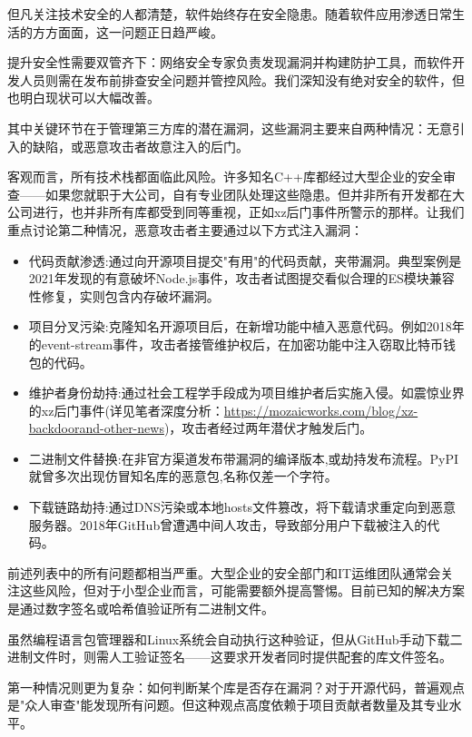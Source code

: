 
但凡关注技术安全的人都清楚，软件始终存在安全隐患。随着软件应用渗透日常生活的方方面面，这一问题正日趋严峻。

提升安全性需要双管齐下：网络安全专家负责发现漏洞并构建防护工具，而软件开发人员则需在发布前排查安全问题并管控风险。我们深知没有绝对安全的软件，但也明白现状可以大幅改善。

其中关键环节在于管理第三方库的潜在漏洞，这些漏洞主要来自两种情况：无意引入的缺陷，或恶意攻击者故意注入的后门。

客观而言，所有技术栈都面临此风险。许多知名C++库都经过大型企业的安全审查——如果您就职于大公司，自有专业团队处理这些隐患。但并非所有开发都在大公司进行，也并非所有库都受到同等重视，正如xz后门事件所警示的那样。让我们重点讨论第二种情况，恶意攻击者主要通过以下方式注入漏洞：

\begin{itemize}
\item 
代码贡献渗透:通过向开源项目提交"有用"的代码贡献，夹带漏洞。典型案例是2021年发现的有意破坏Node.js事件，攻击者试图提交看似合理的ES模块兼容性修复，实则包含内存破坏漏洞。

\item 
项目分叉污染:克隆知名开源项目后，在新增功能中植入恶意代码。例如2018年的event-stream事件，攻击者接管维护权后，在加密功能中注入窃取比特币钱包的代码。

\item 
维护者身份劫持:通过社会工程学手段成为项目维护者后实施入侵。如震惊业界的xz后门事件(详见笔者深度分析：\url{https://mozaicworks.com/blog/xz-backdoorand-other-news})，攻击者经过两年潜伏才触发后门。

\item 
二进制文件替换:在非官方渠道发布带漏洞的编译版本,或劫持发布流程。PyPI就曾多次出现仿冒知名库的恶意包,名称仅差一个字符。

\item 
下载链路劫持:通过DNS污染或本地hosts文件篡改，将下载请求重定向到恶意服务器。2018年GitHub曾遭遇中间人攻击，导致部分用户下载被注入的代码。
\end{itemize}

前述列表中的所有问题都相当严重。大型企业的安全部门和IT运维团队通常会关注这些风险，但对于小型企业而言，可能需要额外提高警惕。目前已知的解决方案是通过数字签名或哈希值验证所有二进制文件。

虽然编程语言包管理器和Linux系统会自动执行这种验证，但从GitHub手动下载二进制文件时，则需人工验证签名——这要求开发者同时提供配套的库文件签名。

第一种情况则更为复杂：如何判断某个库是否存在漏洞？对于开源代码，普遍观点是"众人审查"能发现所有问题。但这种观点高度依赖于项目贡献者数量及其专业水平。

